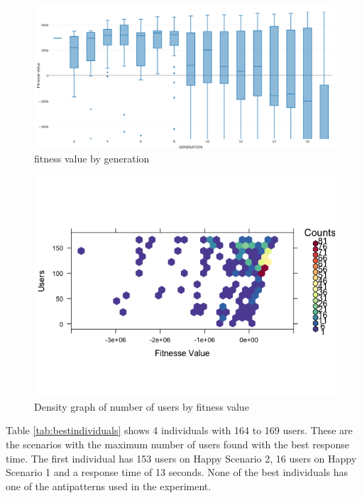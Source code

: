 \begin{figure}[H]

\centering
\includegraphics[width=1\textwidth]{./images/experiment1-5.png}
\caption{fitness value by generation}
\label{fig:summaryboxplot1}
\end{figure}
\begin{figure}[H]
\centering
\includegraphics[width=1\textwidth]{./images/experiment1-6.png}
\caption{Density graph of number of users by fitness value}
\label{fig:density1}

\end{figure}

Table \ref{tab:bestindividuals} shows 4 individuals with 164 to 169 users. These are the scenarios with the maximum number of users found with the best response time. The first individual has 153 users on Happy Scenario 2, 16 users on Happy Scenario 1 and a response time of 13 seconds. None of the best individuals has one of the antipatterns used in the experiment.



